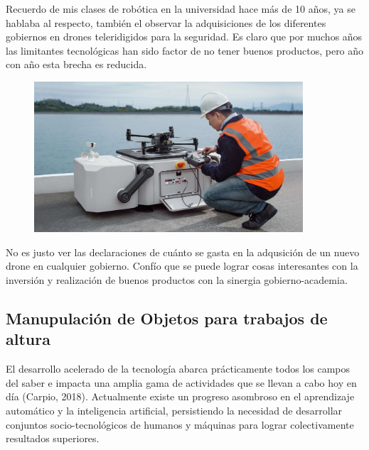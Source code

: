 \documentclass{article}
\begin{document}
Recuerdo de mis clases de robótica en la universidad hace más de 10 años, ya se hablaba al respecto, también el observar la adquisiciones de los diferentes gobiernos en drones teleridigidos para la seguridad. Es claro que por muchos años las limitantes tecnológicas han sido factor de no tener buenos productos, pero año con año esta brecha es reducida.\\

\begin{figure}[h]
\includegraphics[width=10cm]{pictures/drone_box.jpg}
\centering
\end{figure}

No es justo ver las declaraciones de cuánto se gasta en la adqusición de un nuevo drone en cualquier gobierno. Confío que se puede lograr cosas interesantes con la inversión y realización de buenos productos con la sinergia gobierno-academia. 



\newpage
\subsection{Manupulación de Objetos para trabajos de altura}

El desarrollo acelerado de la tecnología abarca prácticamente todos los campos del saber e impacta una amplia gama de actividades que se llevan a cabo hoy en día (Carpio, 2018). Actualmente existe un progreso asombroso en el aprendizaje automático y la inteligencia artificial, persistiendo la necesidad de desarrollar conjuntos socio-tecnológicos de humanos y máquinas para lograr colectivamente resultados superiores.\\
\end{document}
